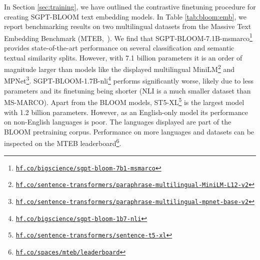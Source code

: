 \documentclass[twoside,11pt]{article}
\begin{document}
In Section \ref{sec:training}, we have outlined the contrastive finetuning procedure for creating SGPT-BLOOM text embedding models. In Table \ref{tab:bloom:emb}, we report benchmarking results on two multilingual datasets from the Massive Text Embedding Benchmark (MTEB,~\citealp{muennighoff2022mteb}). We find that SGPT-BLOOM-7.1B-msmarco\footnote{\href{https://hf.co/bigscience/sgpt-bloom-7b1-msmarco}{\texttt{hf.co/bigscience/sgpt-bloom-7b1-msmarco}}} provides state-of-the-art performance on several classification and semantic textual similarity splits. However, with 7.1 billion parameters it is an order of magnitude larger than models like the displayed multilingual MiniLM\footnote{\href{https://hf.co/sentence-transformers/paraphrase-multilingual-MiniLM-L12-v2}{\texttt{hf.co/sentence-transformers/paraphrase-multilingual-MiniLM-L12-v2}}} and MPNet\footnote{\href{https://hf.co/sentence-transformers/paraphrase-multilingual-mpnet-base-v2}{\texttt{hf.co/sentence-transformers/paraphrase-multilingual-mpnet-base-v2}}}. SGPT-BLOOM-1.7B-nli\footnote{\href{https://hf.co/bigscience-data/sgpt-bloom-1b7-nli}{\texttt{hf.co/bigscience/sgpt-bloom-1b7-nli}}} performs significantly worse, likely due to less parameters and its finetuning being shorter (NLI is a much smaller dataset than MS-MARCO). Apart from the BLOOM models, ST5-XL\footnote{\href{https://hf.co/sentence-transformers/sentence-t5-xl}{\texttt{hf.co/sentence-transformers/sentence-t5-xl}}} is the largest model with 1.2 billion parameters. However, as an English-only model its performance on non-English languages is poor. The languages displayed are part of the BLOOM pretraining corpus. Performance on more languages and datasets can be inspected on the MTEB leaderboard\footnote{\href{https://hf.co/spaces/mteb/leaderboard}{\texttt{hf.co/spaces/mteb/leaderboard}}}.



\end{document}
